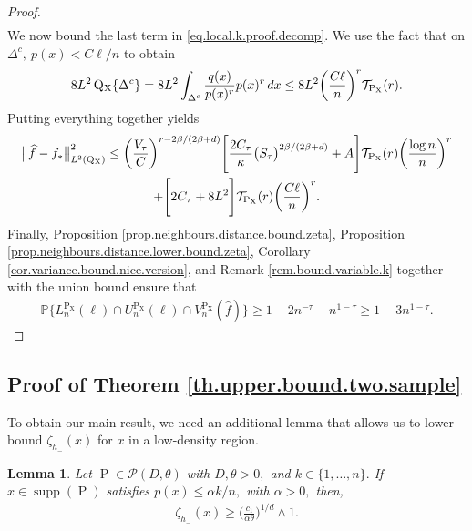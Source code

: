 \documentclass[10pt]{article}
\newcommand{\mP}{\mathcal{P}}
\newcommand{\mT}{\mathcal{T}}
\newcommand{\PP}{\mathbb{P}}
\renewcommand{\P}{\operatorname{P}}
\newcommand{\Q}{\operatorname{Q}}
\newcommand{\wh}{\widehat}
\newcommand{\supp}{\operatorname{supp}}
\newcommand{\sX}{\mathrm{X}}
\newtheorem{lemma}[theorem]{Lemma}
\begin{document}
\begin{proof}
\begin{align*}
    \end{align*}
    We now bound the last term in \eqref{eq.local.k.proof.decomp}. We use the fact that on $\Delta^c, \ p(x) < C\ell/n$ to obtain
    \begin{align}
        \label{eq.local.one.sample.bias.lp.bound}
        8L^2\Q\mathstrut_{\!\sX}\{\Delta^c\} = 8L^2\int_{\Delta^c}\frac{q(x)}{p(x)^r}p(x)^{r}\, dx \leq 8L^2\bigg(\frac{C\ell}n\bigg)^r\mT_{\P_{\sX}}(r).
    \end{align}
    Putting everything together yields
    \begin{multline*}
        \big\|\wh f - f_*\big\|_{L^2(\Q\mathstrut_{\!\sX})}^2 \leq \bigg(\frac{V_\tau}{C}\bigg)^{r - 2\beta/(2\beta +d)}\Bigg[\frac{2C_\tau}{\kappa}\big(S_\tau\big)^{2\beta/(2\beta + d)} + A\Bigg]\mT_{\P_{\sX}}(r)\bigg(\frac{\log n}{n}\bigg)^{r}\\
        + \Bigg[2C_\tau + 8L^2\Bigg]\mT_{\P_{\sX}}(r)\bigg(\frac{C\ell}{n}\bigg)^{r}.
    \end{multline*}
    Finally, Proposition \ref{prop.neighbours.distance.bound.zeta}, Proposition \ref{prop.neighbours.distance.lower.bound.zeta}, Corollary \ref{cor.variance.bound.nice.version}, and Remark \ref{rem.bound.variable.k} together with the union bound ensure that
    \begin{align*}
        \PP\Bigg\{L_n^{\P_{\sX}}(\ell)\cap U_n^{\P_{\sX}}(\ell)\cap V_n^{\P_{\sX}}(\wh f)\Bigg\} \geq 1 - 2n^{-\tau} - n^{1-\tau} \geq 1 - 3n^{1-\tau}.
    \end{align*}
\end{proof}


\subsection{Proof of Theorem \ref{th.upper.bound.two.sample}}


To obtain our main result, we need an additional lemma that allows us to lower bound $\zeta_{h_-}(x)$ for $x$ in a low-density region.
\begin{lemma}
    \label{lem.bounded.below.zeta.low.density}
    Let $\P \in \mP(D, \theta)$ with $D, \theta > 0,$ and $k \in \{1, \dots, n\}.$ If $x \in \supp(\P)$ satisfies $p(x) \leq \alpha k/n,$ with $\alpha > 0,$ then, 
    \begin{align*}
         \zeta_{h_-}(x) \geq \bigg(\frac{c_1}{\alpha \theta}\bigg)^{1/d} \wedge 1.
    \end{align*}
\end{lemma}
\end{document}
